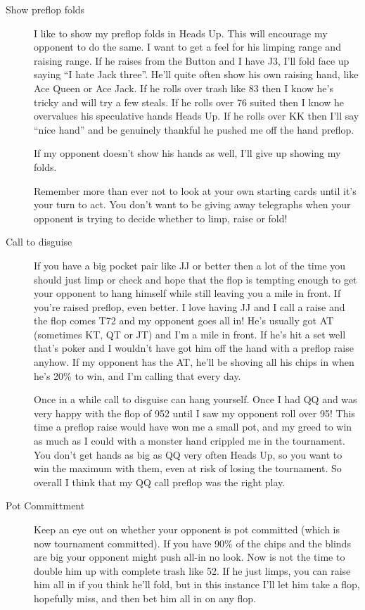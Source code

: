 \begin{description}
\item[Show preflop folds] I like to show my
preflop folds in Heads Up. This will encourage my
opponent to do the same. I want to get a feel for his
limping range and raising range. If he raises from the
Button and I have J3, I'll fold face up saying ``I hate
Jack three''. He'll quite often show his own raising hand,
like Ace Queen or Ace Jack. If he rolls over trash like
83 then I know he's tricky and will try a few steals.
If he rolls over 76 suited then I know he overvalues
his speculative hands Heads Up. If he rolls over KK
then I'll say ``nice hand'' and be genuinely thankful
he pushed me off the hand preflop.

If my opponent doesn't show his hands as well, I'll give
up showing my folds.

Remember more than ever not to look at your own
starting cards until it's your turn to act. You
don't want to be giving away telegraphs when your
opponent is trying to decide whether to limp, raise
or fold!

\item[Call to disguise] If you have a big pocket
pair like JJ or better then a lot of the time
you should just limp or check and hope that the
flop is tempting enough to get your opponent to hang himself
while still leaving you a mile in front. If you're
raised preflop, even better. I love having JJ
and I call a raise and the flop comes T72 and my
opponent goes all in! He's usually got AT (sometimes
KT, QT or JT) and I'm a mile in front. If he's hit
a set well that's poker and I wouldn't have got him
off the hand with a preflop raise anyhow. If my
opponent has the AT, he'll be shoving
all his chips in when he's 20\% to win, and I'm calling
that every day.

Once in a while call to disguise can hang yourself. Once
I had QQ and was very happy with the flop of 952 until I
saw my opponent roll over 95! This time a preflop raise
would have won me a small pot, and my greed to win as much
as I could with a monster hand crippled me in the tournament.
You don't get hands as big as QQ very often Heads Up, so
you want to win the maximum with them, even at risk
of losing the tournament. So overall I think that my QQ call
preflop was the right play.

\item[Pot Committment] Keep an eye out on whether your opponent is pot committed
(which is now tournament committed). If you have 90\% of the chips and
the blinds are big your opponent might push all-in no look.
Now is not the time to double him up with complete trash like
52. If he just limps, you can raise him all in if you think
he'll fold, but in this instance I'll let him take a flop,
hopefully miss, and then bet him all in on any flop.

\end{description}
